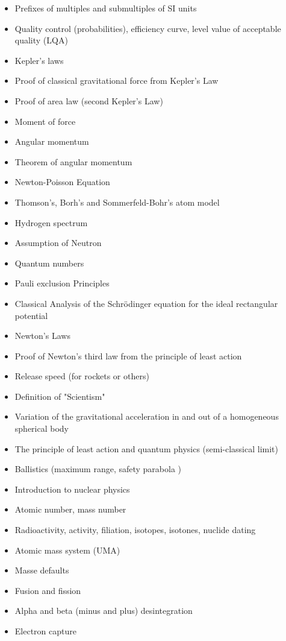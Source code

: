 \documentclass[12pt,a4paper,twoside,openright]{report}
\newcounter{def}
\theoremstyle{definition}
\theoremstyle{itexmp}
\numberwithin{equation}{section}
\begin{document}
\begin{itemize}
\begin{itemize}[noitemsep]
				\item Prefixes of multiples and submultiples of SI units
				\item Quality control (probabilities), efficiency curve, level value of acceptable quality (LQA)
				\item Kepler's laws
				\item Proof of classical gravitational force from Kepler's Law
				\item Proof of area law (second Kepler's Law)
				\item Moment of force
				\item Angular momentum
				\item Theorem of angular momentum
				\item Newton-Poisson Equation
				\item Thomson's, Borh's and Sommerfeld-Bohr's atom model
				\item Hydrogen spectrum
				\item Assumption of Neutron
				\item Quantum numbers
				\item Pauli exclusion Principles
				\item Classical Analysis of the Schrödinger equation for the ideal rectangular potential
				\item Newton's Laws
				\item Proof of Newton's third law from the principle of least action
				\item Release speed (for rockets or others)
				\item Definition of "Scientism"
				\item Variation of the gravitational acceleration in and out of a homogeneous spherical body
				\item The principle of least action and quantum physics (semi-classical limit)
				\item Ballistics (maximum range, safety parabola )
				\item Introduction to nuclear physics
				\item Atomic number, mass number
				\item Radioactivity, activity, filiation, isotopes, isotones, nuclide dating
				\item Atomic mass system (UMA)
				\item Masse defaults
				\item Fusion and fission
				\item Alpha and beta (minus and plus) desintegration
				\item Electron capture

\end{itemize}
\end{itemize}
\end{document}
